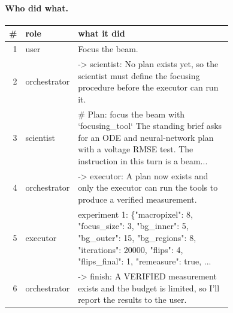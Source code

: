 \paragraph{Who did what.}
\begin{longtable}{@{}r l p{0.74\linewidth}@{}}
\toprule \# & role & what it did\\ \midrule \endhead
1 & user & Focus the beam.\\
2 & orchestrator & -\textgreater{} scientist: No plan exists yet, so the scientist must define the focusing procedure before the executor can run it.\\
3 & scientist & \# Plan: focus the beam with `focusing\_tool` The standing brief asks for an ODE and neural-network plan with a voltage RMSE test. The instruction in this turn is a beam...\\
4 & orchestrator & -\textgreater{} executor: A plan now exists and only the executor can run the tools to produce a verified measurement.\\
5 & executor & experiment 1: \{"macropixel": 8, "focus\_size": 3, "bg\_inner": 5, "bg\_outer": 15, "bg\_regions": 8, "iterations": 20000, "flips": 4, "flips\_final": 1, "remeasure": true, ...\\
6 & orchestrator & -\textgreater{} finish: A VERIFIED measurement exists and the budget is limited, so I'll report the results to the user.\\
\bottomrule
\end{longtable}
